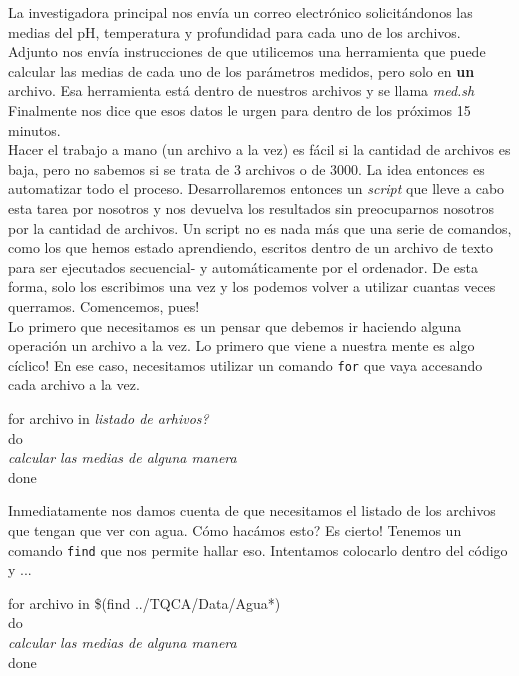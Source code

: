\documentclass[10pt,letterpaper]{article}
\newcommand{\inlinecode}[1]{
\colorbox{light-gray}{\texttt{#1}}
}
\newenvironment{Code}
{
\begin{lrbox}{\selvestebox}%
\begin{minipage}{\dimexpr\columnwidth-2\fboxsep\relax}
\fontfamily{\ttdefault}\selectfont
}
{\end{minipage}\end{lrbox}%
\begin{center}
\colorbox{light-gray}{\usebox{\selvestebox}}
\end{center}
}
\begin{document}
La investigadora principal nos env\'ia un correo electr\'onico solicit\'andonos las medias del pH, temperatura y profundidad para cada uno de los archivos. Adjunto nos env\'ia instrucciones de que utilicemos una herramienta que puede calcular las medias de cada uno de los par\'ametros medidos, pero solo en \textbf{un} archivo. Esa herramienta est\'a dentro de nuestros archivos y se llama \emph{med.sh} Finalmente nos dice que esos datos le urgen para dentro de los pr\'oximos 15 minutos.\\

Hacer el trabajo a mano (un archivo a la vez) es f\'acil si la cantidad de archivos es baja, pero no sabemos si se trata de 3 archivos o de 3000. La idea entonces es automatizar todo el proceso. Desarrollaremos entonces un \emph{script} que lleve a cabo esta tarea por nosotros y nos devuelva los resultados sin preocuparnos nosotros por la cantidad de archivos. Un script no es nada m\'as que una serie de comandos, como los que hemos estado aprendiendo, escritos dentro de un archivo de texto para ser ejecutados secuencial- y autom\'aticamente por el ordenador. De esta forma, solo los escribimos una vez y los podemos volver a utilizar cuantas veces querramos. Comencemos, pues!\\

Lo primero que necesitamos es un pensar que debemos ir haciendo alguna operaci\'on un archivo a la vez. Lo primero que viene a nuestra mente es algo c\'iclico! En ese caso, necesitamos utilizar un comando \inlinecode{for} que vaya accesando cada archivo a la vez.

\begin{Code}
for archivo in \emph{listado de arhivos?}\\
do\\
\emph{calcular las medias de alguna manera}\\
done
\end{Code}

Inmediatamente nos damos cuenta de que necesitamos el listado de los archivos que tengan que ver con agua. C\'omo hac\'amos esto? Es cierto! Tenemos un comando \inlinecode{find} que nos permite hallar eso. Intentamos colocarlo dentro del c\'odigo y ...

\begin{Code}
for archivo in \$(find ../TQCA/Data/Agua*)\\
do\\
\emph{calcular las medias de alguna manera}\\
done
\end{Code}
\end{document}
